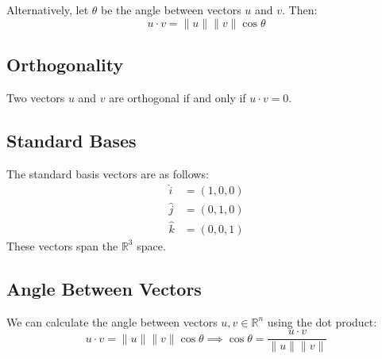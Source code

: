 \documentclass{article}
\begin{document}
Alternatively, let $\theta$ be the angle between vectors $u$ and $v$. Then:
\begin{equation*}
    u\cdot v=\lVert u \rVert \lVert v \rVert\cos\theta
\end{equation*}

\subsection{Orthogonality}

Two vectors $u$ and $v$ are orthogonal if and only if $u\cdot v=0$.

\subsection{Standard Bases}

The standard basis vectors are as follows:
\begin{align*}
	\hat i &= (1,0,0) \\
	\hat j &= (0,1,0) \\
	\hat k &= (0,0,1)
\end{align*}
These vectors span the $\mathbb R^3$ space.

\subsection{Angle Between Vectors}

We can calculate the angle between vectors $u,v\in\mathbb R^n$ using the dot product:
\begin{equation*}
    u\cdot v=\lVert u \rVert \lVert v \rVert \cos\theta
	\implies \cos\theta=\frac{u\cdot v}{\lVert u \rVert \lVert v \rVert }
\end{equation*}
\end{document}

